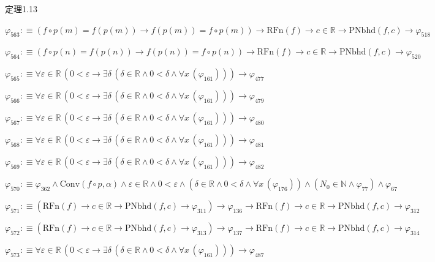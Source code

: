 \begin{fullproof}{定理1.13}
\begin{abbrevlist}
\item $\varphi_{563} :\equiv (f \circ p(m) = f(p(m)) \to f(p(m)) = f \circ p(m)) \to \mathrm{RFn}(f) \to c \in \mathbb{R} \to \mathrm{PNbhd}(f,c) \to \varphi_{518}$
\item $\varphi_{564} :\equiv (f \circ p(n) = f(p(n)) \to f(p(n)) = f \circ p(n)) \to \mathrm{RFn}(f) \to c \in \mathbb{R} \to \mathrm{PNbhd}(f,c) \to \varphi_{520}$
\item $\varphi_{565} :\equiv \forall \varepsilon \in \mathbb{R}\,(0 < \varepsilon \to \exists \delta\,(\delta \in \mathbb{R} \land 0 < \delta \land \forall x\,(\varphi_{161}))) \to \varphi_{477}$
\item $\varphi_{566} :\equiv \forall \varepsilon \in \mathbb{R}\,(0 < \varepsilon \to \exists \delta\,(\delta \in \mathbb{R} \land 0 < \delta \land \forall x\,(\varphi_{161}))) \to \varphi_{479}$
\item $\varphi_{567} :\equiv \forall \varepsilon \in \mathbb{R}\,(0 < \varepsilon \to \exists \delta\,(\delta \in \mathbb{R} \land 0 < \delta \land \forall x\,(\varphi_{161}))) \to \varphi_{480}$
\item $\varphi_{568} :\equiv \forall \varepsilon \in \mathbb{R}\,(0 < \varepsilon \to \exists \delta\,(\delta \in \mathbb{R} \land 0 < \delta \land \forall x\,(\varphi_{161}))) \to \varphi_{481}$
\item $\varphi_{569} :\equiv \forall \varepsilon \in \mathbb{R}\,(0 < \varepsilon \to \exists \delta\,(\delta \in \mathbb{R} \land 0 < \delta \land \forall x\,(\varphi_{161}))) \to \varphi_{482}$
\item $\varphi_{570} :\equiv \varphi_{362} \land \mathrm{Conv}(f \circ p,\alpha) \land \varepsilon \in \mathbb{R} \land 0 < \varepsilon \land (\delta \in \mathbb{R} \land 0 < \delta \land \forall x\,(\varphi_{176})) \land (N_{0} \in \mathbb{N} \land \varphi_{77}) \land \varphi_{67}$
\item $\varphi_{571} :\equiv (\mathrm{RFn}(f) \to c \in \mathbb{R} \to \mathrm{PNbhd}(f,c) \to \varphi_{311}) \to \varphi_{136} \to \mathrm{RFn}(f) \to c \in \mathbb{R} \to \mathrm{PNbhd}(f,c) \to \varphi_{312}$
\item $\varphi_{572} :\equiv (\mathrm{RFn}(f) \to c \in \mathbb{R} \to \mathrm{PNbhd}(f,c) \to \varphi_{313}) \to \varphi_{137} \to \mathrm{RFn}(f) \to c \in \mathbb{R} \to \mathrm{PNbhd}(f,c) \to \varphi_{314}$
\item $\varphi_{573} :\equiv \forall \varepsilon \in \mathbb{R}\,(0 < \varepsilon \to \exists \delta\,(\delta \in \mathbb{R} \land 0 < \delta \land \forall x\,(\varphi_{161}))) \to \varphi_{487}$

\end{abbrevlist}
\end{fullproof}
